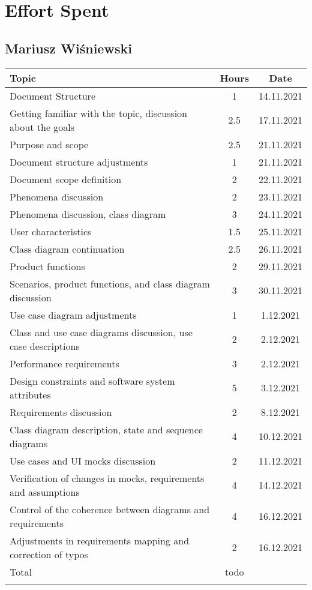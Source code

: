 \chapter{Effort Spent}

\section*{Mariusz Wiśniewski}
\begin{table}[H]
    \centering
    \begin{tabular}{lcc} \Xhline{1.5pt}
        Topic & Hours & Date\\ \hline
        Document Structure & 1 & 14.11.2021\\ 
        Getting familiar with the topic, discussion about the goals & 2.5 & 17.11.2021\\ 
        Purpose and scope & 2.5 & 21.11.2021\\ 
        Document structure adjustments & 1 & 21.11.2021\\
        Document scope definition & 2 & 22.11.2021\\
        Phenomena discussion & 2 & 23.11.2021\\
        Phenomena discussion, class diagram & 3 & 24.11.2021\\ 
        User characteristics & 1.5 & 25.11.2021\\ 
        Class diagram continuation & 2.5 & 26.11.2021 \\ 
        Product functions & 2 & 29.11.2021 \\
        Scenarios, product functions, and class diagram discussion & 3 & 30.11.2021\\
        Use case diagram adjustments & 1 & 1.12.2021\\
        Class and use case diagrams discussion, use case descriptions & 2 & 2.12.2021\\ 
        Performance requirements & 3 & 2.12.2021\\
        Design constraints and software system attributes & 5 & 3.12.2021\\
        Requirements discussion & 2 & 8.12.2021\\
        Class diagram description, state and sequence diagrams & 4 & 10.12.2021\\ 
        Use cases and UI mocks discussion & 2 & 11.12.2021\\
        Verification of changes in mocks, requirements and assumptions & 4 & 14.12.2021\\
        Control of the coherence between diagrams and requirements & 4 & 16.12.2021\\
        Adjustments in requirements mapping and correction of typos & 2 & 16.12.2021\\
        \hline
        Total & todo &\\ \Xhline{1.5pt}
    \end{tabular}
\end{table}

